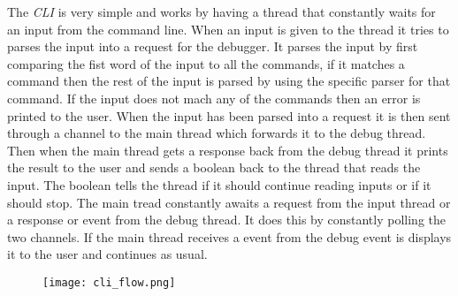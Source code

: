 The \emph{CLI} is very simple and works by having a thread that constantly waits for an input from the command line.
When an input is given to the thread it tries to parses the input into a request for the debugger.
It parses the input by first comparing the fist word of the input to all the commands, if it matches a command then the rest of the input is parsed by using the specific parser for that command.
If the input does not mach any of the commands then an error is printed to the user.
When the input has been parsed into a request it is then sent through a channel to the main thread which forwards it to the debug thread.
Then when the main thread gets a response back from the debug thread it prints the result to the user and sends a boolean back to the thread that reads the input.
The boolean tells the thread if it should continue reading inputs or if it should stop.
The main tread constantly awaits a request from the input thread or a response or event from the debug thread.
It does this by constantly polling the two channels.
If the main thread receives a event from the debug event is displays it to the user and continues as usual.


\begin{figure}[h]
    \centering
    \texttt{[image: cli\_flow.png]}
    \label{fig:cliflow}
\end{figure}


